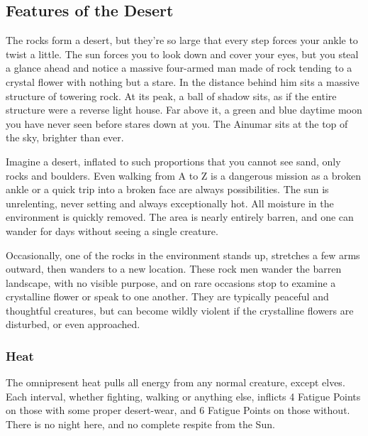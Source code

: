 \begin{multicols}{2}

\subsection{Features of the Desert}


\begin{boxtext}

  The rocks form a desert, but they're so large that every step forces your ankle to twist a little.
  The sun forces you to look down and cover your eyes, but you steal a glance ahead and notice a massive four-armed man made of rock tending to a crystal flower with nothing but a stare.
  In the distance behind him sits a massive structure of towering rock.
  At its peak, a ball of shadow sits, as if the entire structure were a reverse light house.
  Far above it, a green and blue daytime moon you have never seen before stares down at you.
  The Ainumar sits at the top of the sky, brighter than ever.

\end{boxtext}

\noindent
Imagine a desert, inflated to such proportions that you cannot see sand, only rocks and boulders.
Even walking from A to Z is a dangerous mission as a broken ankle or a quick trip into a broken face are always possibilities.  The sun is unrelenting, never setting and always exceptionally hot.  All moisture in the environment is quickly removed.  The area is nearly entirely barren, and one can wander for days without seeing a single creature.

Occasionally, one of the rocks in the environment stands up, stretches a few arms outward, then wanders to a new location.
These rock men wander the barren landscape, with no visible purpose, and on rare occasions stop to examine a crystalline flower or speak to one another.
They are typically peaceful and thoughtful creatures, but can become wildly violent if the crystalline flowers are disturbed, or even approached.

\subsubsection{Heat}

The omnipresent heat pulls all energy from any normal creature, except elves.
Each \gls{interval}, whether fighting, walking or anything else, inflicts 4 Fatigue Points on those with some proper desert-wear, and 6 Fatigue Points on those without.
There is no night here, and no complete respite from the Sun.


\end{multicols}
